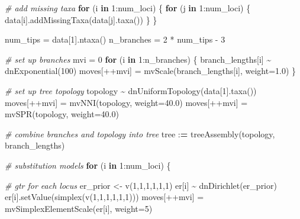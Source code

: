 \documentclass[
]{book}
\newenvironment{Shaded}{\begin{snugshade}}{\end{snugshade}}
\newcommand{\AttributeTok}[1]{\textcolor[rgb]{0.77,0.63,0.00}{#1}}
\newcommand{\CommentTok}[1]{\textcolor[rgb]{0.56,0.35,0.01}{\textit{#1}}}
\newcommand{\ControlFlowTok}[1]{\textcolor[rgb]{0.13,0.29,0.53}{\textbf{#1}}}
\newcommand{\DecValTok}[1]{\textcolor[rgb]{0.00,0.00,0.81}{#1}}
\newcommand{\ErrorTok}[1]{\textcolor[rgb]{0.64,0.00,0.00}{\textbf{#1}}}
\newcommand{\FloatTok}[1]{\textcolor[rgb]{0.00,0.00,0.81}{#1}}
\newcommand{\FunctionTok}[1]{\textcolor[rgb]{0.00,0.00,0.00}{#1}}
\newcommand{\NormalTok}[1]{#1}
\newcommand{\OtherTok}[1]{\textcolor[rgb]{0.56,0.35,0.01}{#1}}
\newcommand{\SpecialCharTok}[1]{\textcolor[rgb]{0.00,0.00,0.00}{#1}}
\begin{document}
\begin{Shaded}
\begin{Highlighting}[]
\CommentTok{\# add missing taxa}
\ControlFlowTok{for}\NormalTok{ (i }\ControlFlowTok{in} \DecValTok{1}\SpecialCharTok{:}\NormalTok{num\_loci) \{}
    \ControlFlowTok{for}\NormalTok{ (j }\ControlFlowTok{in} \DecValTok{1}\SpecialCharTok{:}\NormalTok{num\_loci) \{}
\NormalTok{        data[i]}\FunctionTok{.addMissingTaxa}\NormalTok{(data[j]}\FunctionTok{.taxa}\NormalTok{())}
\NormalTok{    \}}
\NormalTok{\}}

\NormalTok{num\_tips }\OtherTok{=}\NormalTok{ data[}\DecValTok{1}\NormalTok{]}\FunctionTok{.ntaxa}\NormalTok{()}
\NormalTok{n\_branches }\OtherTok{=} \DecValTok{2} \SpecialCharTok{*}\NormalTok{ num\_tips }\SpecialCharTok{{-}} \DecValTok{3}

\CommentTok{\# set up branches}
\NormalTok{mvi }\OtherTok{=} \DecValTok{0}
\ControlFlowTok{for}\NormalTok{ (i }\ControlFlowTok{in} \DecValTok{1}\SpecialCharTok{:}\NormalTok{n\_branches) \{}
\NormalTok{    branch\_lengths[i] }\SpecialCharTok{\textasciitilde{}} \FunctionTok{dnExponential}\NormalTok{(}\DecValTok{100}\NormalTok{)}
\NormalTok{    moves[}\SpecialCharTok{++}\NormalTok{mvi] }\OtherTok{=} \FunctionTok{mvScale}\NormalTok{(branch\_lengths[i], }\AttributeTok{weight=}\FloatTok{1.0}\NormalTok{)}
\NormalTok{\}}

\CommentTok{\# set up tree topology}
\NormalTok{topology }\SpecialCharTok{\textasciitilde{}} \FunctionTok{dnUniformTopology}\NormalTok{(data[}\DecValTok{1}\NormalTok{]}\FunctionTok{.taxa}\NormalTok{())}
\NormalTok{moves[}\SpecialCharTok{++}\NormalTok{mvi] }\OtherTok{=} \FunctionTok{mvNNI}\NormalTok{(topology, }\AttributeTok{weight=}\FloatTok{40.0}\NormalTok{)}
\NormalTok{moves[}\SpecialCharTok{++}\NormalTok{mvi] }\OtherTok{=} \FunctionTok{mvSPR}\NormalTok{(topology, }\AttributeTok{weight=}\FloatTok{40.0}\NormalTok{)}

\CommentTok{\# combine branches and topology into tree}
\NormalTok{tree }\SpecialCharTok{:}\ErrorTok{=} \FunctionTok{treeAssembly}\NormalTok{(topology, branch\_lengths)}

\CommentTok{\# substitution models}
\ControlFlowTok{for}\NormalTok{ (i }\ControlFlowTok{in} \DecValTok{1}\SpecialCharTok{:}\NormalTok{num\_loci) \{}
    
    \CommentTok{\# gtr for each locus}
\NormalTok{    er\_prior }\OtherTok{\textless{}{-}} \FunctionTok{v}\NormalTok{(}\DecValTok{1}\NormalTok{,}\DecValTok{1}\NormalTok{,}\DecValTok{1}\NormalTok{,}\DecValTok{1}\NormalTok{,}\DecValTok{1}\NormalTok{,}\DecValTok{1}\NormalTok{)}
\NormalTok{    er[i] }\SpecialCharTok{\textasciitilde{}} \FunctionTok{dnDirichlet}\NormalTok{(er\_prior)}
\NormalTok{    er[i]}\FunctionTok{.setValue}\NormalTok{(}\FunctionTok{simplex}\NormalTok{(}\FunctionTok{v}\NormalTok{(}\DecValTok{1}\NormalTok{,}\DecValTok{1}\NormalTok{,}\DecValTok{1}\NormalTok{,}\DecValTok{1}\NormalTok{,}\DecValTok{1}\NormalTok{,}\DecValTok{1}\NormalTok{)))}
\NormalTok{    moves[}\SpecialCharTok{++}\NormalTok{mvi] }\OtherTok{=} \FunctionTok{mvSimplexElementScale}\NormalTok{(er[i], }\AttributeTok{weight=}\DecValTok{5}\NormalTok{)}


\end{Highlighting}
\end{Shaded}
\end{document}
